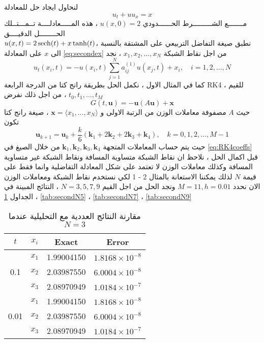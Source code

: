 \newpage
\begin{example}
لنحاول ايجاد حل للمعادلة 
\begin{equation}
	\label{eq:secondex}
u_t + u u_x = x
\end{equation}
مـــــــع الشـــــــــرط الحــــــدودي $u(x, 0) = 2$ ، هذه المـــــعادلــــة تــمـــتــلك الحــــــــل الدقيــــق\\ $u(x,t) = 2\operatorname{sech}(t) + x\tanh(t)$،
نطبق صيغة التفاضل التربيعي على المشتقة بالنسبة الى $x$ على المعادلة \eqref{eq:secondex} من اجل نقاط الشبكة $x_1, x_2, \dots, x_N$ ، نجد
\begin{equation}
	\label{eq:secondexapplied}
	u_t(x_i, t) = - u(x_i, t) \sum_{j=1}^{N} a_{ij}^{(1)} u(x_j, t) + x_i, \quad i=1,2,\dots,N
\end{equation}
كما في المثال الاول ، نكمل الحل بطريقة رانج كتا من الدرجة الرابعة RK4 ،
للقيم $t_0, t_1, \dots, t_M$ ، من اجل ذلك نفرض
\[
G(t, \mathbf{u}) = - \mathbf{u}(A\mathbf{u}) + \mathbf{x} 
\]
حيث $A$ مصفوفة معاملات الوزن من  الرتبة الاولى و
$\mathbf{x}= \langle x_1, \dots, x_N\rangle$ ، صيغة رانج كتا تكون 
 	\begin{equation}
	\label{eq:secondexRK4}
	\mathbf{u}_{k+1} = \mathbf{u}_k + \frac{k}{6} (\mathbf{k}_1+2\mathbf{k}_2+2\mathbf{k}_3+\mathbf{k}_4), \quad k=0,1,2,\dots,M-1
\end{equation}
حيث يتم حساب المعاملات المتجهة 
$\mathbf{k}_1, \mathbf{k}_2, \mathbf{k}_3, \mathbf{k}_4$ من خلال الصيغ في \eqref{eq:RK4coeffs}\\
قبل اكمال الحل ، نلاحظ ان نقاط الشبكة متساوية المسافة ونقاط الشبكة غير متساوية المسافة وكذلك معاملات الوزن لا تعتمد على شكل المعادلة التفاضلية وانما فقط على قيمة $N$ لذلك يمكننا الاستعانة بالمثال 2 - 1 لكي نستخدم نقاط الشبكة ومعاملات الوزن\\
الان نحدد $M=11, h=0.01 $ ونجد الحل من اجل القيم $N=3,5,7,9 $ ، النتائج المبينة في الجداول 
\ref{tab:secondN3} ، \ref{tab:secondN5} ، \ref{tab:secondN7} ، \ref{tab:secondN9}
\newpage
\begin{table}[H]
	\centering
	\renewcommand{\arraystretch}{1.5}
	\begin{english}
		\begin{tabular}{|c|c|c|c|}
			\hline
			$t$ & $x_i$ & Exact & Error\\
			\hline
			\multirow{3}{*}{0.1}  & $x_1$ & 1.99004150  & $1.8168\times10^{-8}$ \\
			& $x_2$ & 2.03987550  & $6.0004\times10^{-8}$ \\
			& $x_3$ & 2.08970949  & $1.0184\times10^{-7}$ \\
			\hline
			\multirow{3}{*}{0.01} & $x_1$ & 1.99004150  & $1.8168\times10^{-8}$ \\
			& $x_2$ & 2.03987550  & $6.0004\times10^{-8}$ \\
			& $x_3$ & 2.08970949  & $1.0184\times10^{-7}$ \\
			\hline
		\end{tabular}
	\end{english}
	\caption{مقارنة النتائج العددية مع التحليلية عندما $N=3$}
	\label{tab:secondN3}
\end{table}


\end{example}

